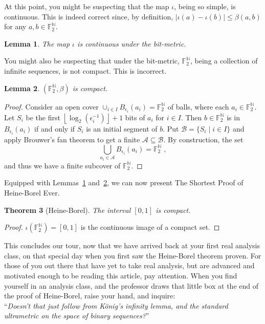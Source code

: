 \documentclass[12pt]{amsart}
\def\F{\mathbb{F}}
\def\N{\mathbb{N}}
\theoremstyle{plain}
\newtheorem{thm}{Theorem}
\newtheorem{lem}[thm]{Lemma}
\theoremstyle{definition}
\theoremstyle{remark}
\begin{document}
At this point, you might be suspecting that the map $\iota$, being so
simple, is continuous. This is indeed correct since, by definition,
$|\iota(a) - \iota(b)| \leq \beta(a, b)$ for any $a, b \in \F_2^\N$.
\begin{lem}
  \label{lemma:iota}
  The map $\iota$ is continuous under the bit-metric.
\end{lem}

You might also be suspecting that under the bit-metric, $\F_2^\N$,
being a collection of infinite sequences, is not compact. This is
incorrect.
\begin{lem}
  \label{lemma:compactness}
  $(\F_2^\N,\beta)$ is compact.
\end{lem}
\begin{proof}
  Consider an open cover $\cup_{i\in I} B_{\epsilon_i}(a_i)=\F_2^\N$
  of balls, where each $a_i\in\F_2^\N$. Let $S_i$ be the first
  $\left\lfloor\log_2(\epsilon_i^{-1})\right\rfloor+1$ bits of $a_i$ for
  $i \in I$.  Then $b\in\F_2^\N$ is in $B_{\epsilon_i}(a_i)$ if and
  only if $S_i$ is an initial segment of $b$.  Put $\mathcal{B} =
  \{S_i \mid i \in I\}$ and apply Brouwer's fan theorem to get a finite
  $\mathcal{A}\subseteq\mathcal{B}$.  By construction, the set
  \[
  \bigcup_{a_i\in\mathcal{A}} B_{\epsilon_i}(a_i)=\F_2^\N\;,
  \]
  and thus we have a finite subcover of $\F_2^\N$.
\end{proof}
Equipped with Lemmas~\ref{lemma:iota} and~\ref{lemma:compactness},
we can now present The Shortest Proof of Heine-Borel Ever.
\begin{thm}[Heine-Borel]
  The interval $[0,1]$ is compact. 
\end{thm}
\begin{proof}
  $\iota(\F_2^\N)=[0,1]$ is the continuous image of a compact set.
\end{proof}

\vspace{0.15in}

This concludes our tour, now that we have arrived back at your first
real analysis class, on that special day when you first saw the
Heine-Borel theorem proven. For those of you out there that have yet
to take real analysis, but are advanced and motivated enough to be
reading this article, pay attention. When you find yourself in an
analysis class, and the professor draws that little box at the end of
the proof of Heine-Borel, raise your hand, and inquire: \\

\noindent ``\emph{Doesn't that just follow from K\"onig's infinity lemma,
and the standard ultrametric on the space of binary sequences?}'' \\
\end{document}
